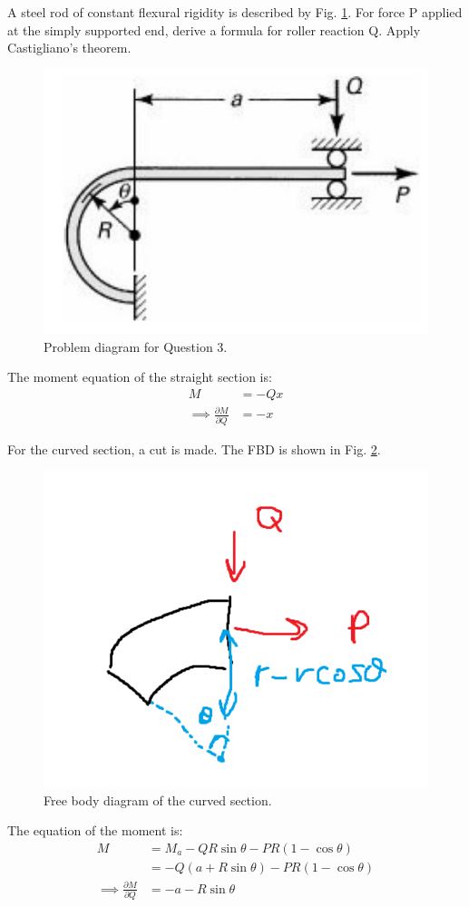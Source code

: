 \section{}
A steel rod of constant flexural rigidity is described by Fig. \ref{fig:Q3ProblemDiagram}. For force P applied
at the simply supported end, derive a formula for roller reaction Q. Apply Castigliano's theorem.

\begin{figure}[h]
    \centering
    \includegraphics[width=0.3\linewidth]{Questions/Figures/Q3ProblemDiagram.png}
    \caption{Problem diagram for Question 3.}
    \label{fig:Q3ProblemDiagram}
\end{figure}

The moment equation of the straight section is:
\begin{align*}
    M &= -Q x \\
    \implies \frac{\partial M}{\partial Q} &= -x 
\end{align*}

For the curved section, a cut is made. The FBD is shown in Fig. \ref{fig:Q3FBD}.
\begin{figure}[h]
    \centering
    \includegraphics[width=0.4\linewidth]{Questions/Figures/Q3FBD.png}
    \caption{Free body diagram of the curved section.}
    \label{fig:Q3FBD}
\end{figure}

The equation of the moment is:
\begin{align*}
    M &= M_a - QR \sin\theta - PR(1-\cos\theta) \\
    &= -Q(a + R \sin\theta) - PR(1-\cos\theta) \\
    \implies \frac{\partial M}{\partial Q} &= -a - R \sin\theta
\end{align*}

